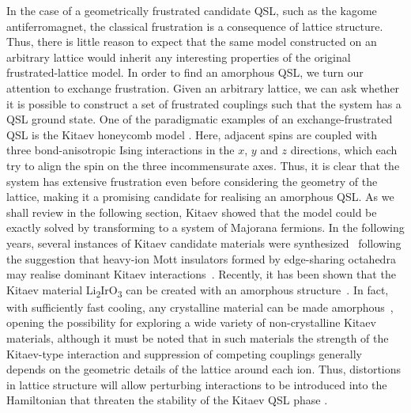 In the case of a geometrically frustrated candidate QSL, such as the kagome antiferromagnet, the classical frustration is a consequence of lattice structure. Thus, there is little reason to expect that the same model constructed on an arbitrary lattice would inherit any interesting properties of the original frustrated-lattice model. In order to find an amorphous QSL, we turn our attention to exchange frustration. Given an arbitrary lattice, we can ask whether it is possible to construct a set of frustrated couplings such that the system has a QSL ground state. One of the paradigmatic examples of an exchange-frustrated QSL is the Kitaev honeycomb model \cite{kitaev_anyons_2006}. Here, adjacent spins are coupled with three bond-anisotropic Ising interactions in the $x$, $y$ and $z$ directions, which each try to align the spin on the three incommensurate axes. Thus, it is clear that the system has extensive frustration even before considering the geometry of the lattice, making it a promising candidate for realising an amorphous QSL. As we shall review in the following section, Kitaev showed that the model could be exactly solved by transforming to a system of Majorana fermions. In the following years, several instances of Kitaev candidate materials were synthesized~\cite{hermanns_physics_2018,winter_models_2017,trebst_kitaev_2022,takagi_concept_2019} following the suggestion that heavy-ion Mott insulators formed by edge-sharing octahedra may realise dominant Kitaev interactions~\cite{jackeli_mott_2009}. Recently, it has been shown that the Kitaev material Li\textsubscript{2}IrO\textsubscript{3} can be created with an amorphous structure~\cite{lee_lithiair_2019}. In fact, with sufficiently fast cooling, any crystalline material can be made amorphous~\cite{zallen_physics_2008,turnbull_under_1969}, opening the possibility for exploring a wide variety of non-crystalline Kitaev materials, although it must be noted that in such materials the strength of the Kitaev-type interaction and suppression of competing couplings generally depends on the geometric details of the lattice around each ion. Thus, distortions in lattice structure will allow perturbing interactions to be introduced into the Hamiltonian that threaten the stability of the Kitaev QSL phase \cite{rau_trigonal_2014,sela_order-by-disorder_2014,trebst_kitaev_2022}.

